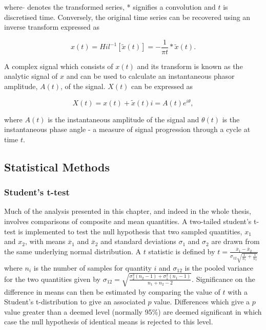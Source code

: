 where $\tilde{}$ denotes the transformed series, * signifies a convolution and $t$ is discretised time. Conversely, the original time series can be recovered using an inverse transform expressed as

\begin{equation} \label{theoretical_fourier}
{x(t)} = Hil^{-1}[\tilde{x}(t)] = -\frac{1}{\pi t} * \tilde{x}(t).
\end{equation}

A complex signal which consists of $x(t)$ and its transform is known as the analytic signal of $x$ and can be used to calculate an instantaneous phasor amplitude, $A(t)$, of the signal. $X(t)$ can be expressed as

\begin{equation} \label{theoretical_fourier}
X(t) = x(t) + \tilde{x}(t) i = A(t) e^{i\theta},
\end{equation}

where $A(t)$ is the instantaneous amplitude of the signal and $\theta(t)$ is the instantaneous phase angle - a measure of signal progression through a cycle at time $t$.

\subsection{Statistical Methods}
\label{sec:stat_tests}

\subsubsection*{Student's t-test}
Much of the analysis presented in this chapter, and indeed in the whole thesis, involves comparisons of composite and mean quantities. A two-tailed student's t-test is implemented to test the null hypothesis that two sampled quantities, $x_1$ and $x_2$, with means $\overline{x}_1$ and $\overline{x}_2$ and standard deviations $\sigma_{1}$ and $\sigma_{2}$ are drawn from the same underlying normal distribution. A $t$ statistic is defined by $t = \frac{\overline{x}_1 - \overline{x}_2}{\sigma_{12} \sqrt{\frac{1}{n_1} + \frac{1}{n_2}}}$ where $n_i$ is the number of samples for quantity $i$ and $\sigma_{12}$ is the pooled variance for the two quantities given by $\sigma_{12} = \sqrt{\frac{\sigma^2_2 (n_2-1) + \sigma^2_1(n_1 - 1)}{n_1+n_2-2}}$. Significance on the difference in means can then be estimated by comparing the value of $t$ with a Student's t-distribution to give an associated $p$ value. Differences which give a $p$ value greater than a deemed level (normally 95\%) are deemed significant in which case the null hypothesis of identical means is rejected to this level.

